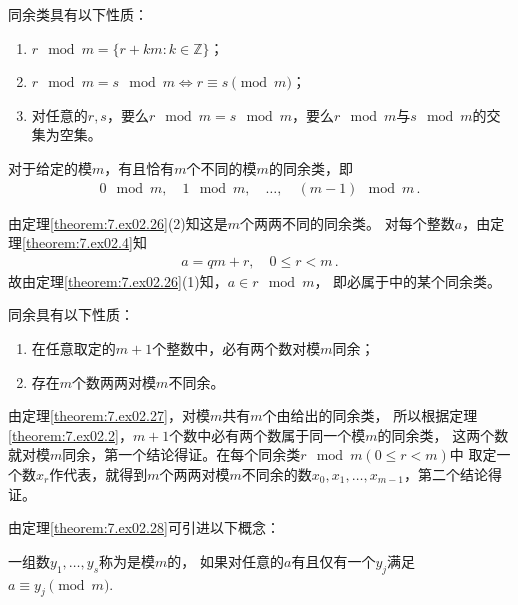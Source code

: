 \begin{theorem}\label{theorem:7.ex02.26}
    同余类具有以下性质：
    \begin{enumerate}
        \item $r\mod{m}=\{r+km:k\in\mathbb{Z}\}$；
        \item $r\mod{m}=s\mod{m}\Leftrightarrow r\equiv s\pmod{m}$；
        \item 对任意的$r,s$，要么$r\mod{m}=s\mod{m}$，要么$r\mod{m}$与$s\mod{m}$的交集为空集。
    \end{enumerate}
\end{theorem}
\begin{theorem}\label{theorem:7.ex02.27}
    对于给定的模$m$，有且恰有$m$个不同的模$m$的同余类，即
    \begin{align}\label{eq:7.ex02.theorem27-02}
        0\mod{m},\quad 1\mod{m},\quad \ldots,\quad (m-1)\mod{m}\, .
    \end{align}
\end{theorem}
\begin{prove}
    由定理\ref{theorem:7.ex02.26}(2)知这是$m$个两两不同的同余类。
    对每个整数$a$，由定理\ref{theorem:7.ex02.4}知
    \begin{align}
        a=qm+r,\quad 0\le r<m\, .
    \end{align}
    故由定理\ref{theorem:7.ex02.26}(1)知，$a\in r\mod{m}$，
    即必属于中的某个同余类。
\end{prove}
\begin{theorem}\label{theorem:7.ex02.28}
    同余具有以下性质：
    \begin{enumerate}
        \item 在任意取定的$m+1$个整数中，必有两个数对模$m$同余；
        \item 存在$m$个数两两对模$m$不同余。
    \end{enumerate}
\end{theorem}
\begin{prove}
    由定理\ref{theorem:7.ex02.27}，对模$m$共有$m$个由给出的同余类，
    所以根据定理\ref{theorem:7.ex02.2}，$m+1$个数中必有两个数属于同一个模$m$的同余类，
    这两个数就对模$m$同余，第一个结论得证。在每个同余类$r\mod{m}(0\le r<m)$中
    取定一个数$x_r$作代表，就得到$m$个两两对模$m$不同余的数$x_0,x_1,\ldots,x_{m-1}$，第二个结论得证。
\end{prove}

由定理\ref{theorem:7.ex02.28}可引进以下概念：
\begin{definition}
    一组数$y_1,\ldots,y_s$称为是模$m$的，
    如果对任意的$a$有且仅有一个$y_j$满足$a\equiv y_j\pmod{m}$.
\end{definition}

